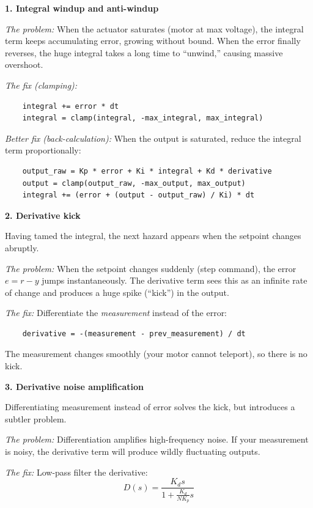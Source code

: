 \textbf{1. Integral windup and anti-windup}

\textit{The problem:} When the actuator saturates (motor at max voltage), the integral term keeps accumulating error, growing without bound. When the error finally reverses, the huge integral takes a long time to ``unwind,'' causing massive overshoot.

\textit{The fix (clamping):}
\begin{verbatim}
    integral += error * dt
    integral = clamp(integral, -max_integral, max_integral)
\end{verbatim}

\textit{Better fix (back-calculation):} When the output is saturated, reduce the integral term proportionally:
\begin{verbatim}
    output_raw = Kp * error + Ki * integral + Kd * derivative
    output = clamp(output_raw, -max_output, max_output)
    integral += (error + (output - output_raw) / Ki) * dt
\end{verbatim}

\textbf{2. Derivative kick}

Having tamed the integral, the next hazard appears when the setpoint changes abruptly.

\textit{The problem:} When the setpoint changes suddenly (step command), the error $e = r - y$ jumps instantaneously. The derivative term sees this as an infinite rate of change and produces a huge spike (``kick'') in the output.

\textit{The fix:} Differentiate the \textit{measurement} instead of the error:
\begin{verbatim}
    derivative = -(measurement - prev_measurement) / dt
\end{verbatim}

The measurement changes smoothly (your motor cannot teleport), so there is no kick.

\textbf{3. Derivative noise amplification}

Differentiating measurement instead of error solves the kick, but introduces a subtler problem.

\textit{The problem:} Differentiation amplifies high-frequency noise. If your measurement is noisy, the derivative term will produce wildly fluctuating outputs.

\textit{The fix:} Low-pass filter the derivative:
\begin{equation}
D(s) = \frac{K_d s}{1 + \frac{K_d}{N K_p} s}
\end{equation}


